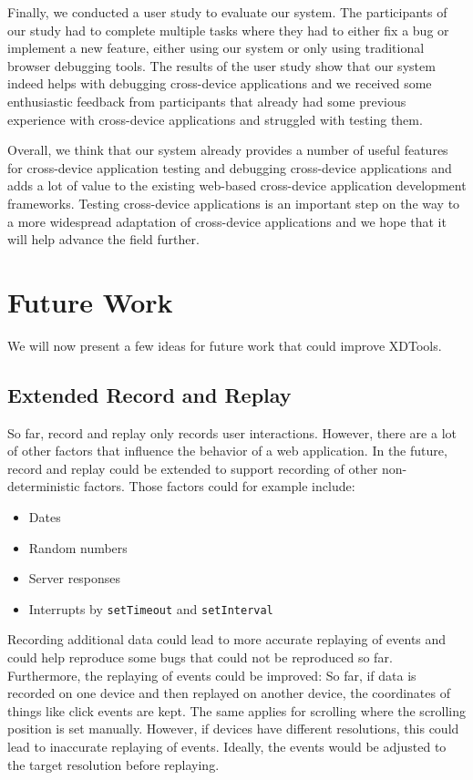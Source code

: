 Finally, we conducted a user study to evaluate our system. The participants of our study had to complete multiple tasks where they had to either fix a bug or implement a new feature, either using our system or only using traditional browser debugging tools. The results of the user study show that our system indeed helps with debugging cross-device applications and we received some enthusiastic feedback from participants that already had some previous experience with cross-device applications and struggled with testing them. 

Overall, we think that our system already provides a number of useful features for cross-device application testing and debugging cross-device applications and adds a lot of value to the existing web-based cross-device application development frameworks. Testing cross-device applications is an important step on the way to a more widespread adaptation of cross-device applications and we hope that it will help advance the field further.

\section{Future Work}

We will now present a few ideas for future work that could improve XDTools.

\subsection{Extended Record and Replay}

So far, record and replay only records user interactions. However, there are a lot of other factors that influence the behavior of a web application. In the future, record and replay could be extended to support recording of other non-deterministic factors. Those factors could for example include:
\begin{itemize}
	\item Dates
	\item Random numbers
	\item Server responses
	\item Interrupts by \lstinline|setTimeout| and \lstinline|setInterval|
\end{itemize}
Recording additional data could lead to more accurate replaying of events and could help reproduce some bugs that could not be reproduced so far. Furthermore, the replaying of events could be improved: So far, if data is recorded on one device and then replayed on another device, the coordinates of things like click events are kept. The same applies for scrolling where the scrolling position is set manually. However, if devices have different resolutions, this could lead to inaccurate replaying of events. Ideally, the events would be adjusted to the target resolution before replaying.

